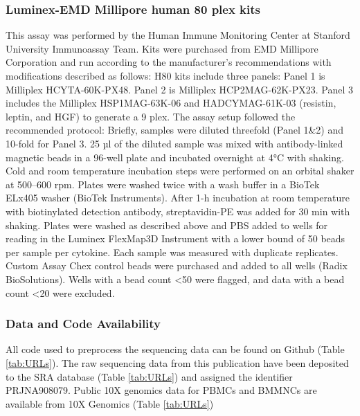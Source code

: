 \subsubsection{Luminex-EMD Millipore human 80 plex kits}

This assay was performed by the Human Immune Monitoring Center at Stanford University Immunoassay Team. Kits were purchased from EMD Millipore Corporation and run according to the manufacturer’s recommendations with modifications described as follows: H80 kits include three panels: Panel 1 is Milliplex HCYTA-60K-PX48. Panel 2 is Milliplex HCP2MAG-62K-PX23. Panel 3 includes the Milliplex HSP1MAG-63K-06 and HADCYMAG-61K-03 (resistin, leptin, and HGF) to generate a 9 plex. The assay setup followed the recommended protocol: Briefly, samples were diluted threefold (Panel 1\&2) and 10-fold for Panel 3. 25 µl of the diluted sample was mixed with antibody-linked magnetic beads in a 96-well plate and incubated overnight at 4°C with shaking. Cold and room temperature incubation steps were performed on an orbital shaker at 500–600 rpm. Plates were washed twice with a wash buffer in a BioTek ELx405 washer (BioTek Instruments). After 1-h incubation at room temperature with biotinylated detection antibody, streptavidin-PE was added for 30 min with shaking. Plates were washed as described above and PBS added to wells for reading in the Luminex FlexMap3D Instrument with a lower bound of 50 beads per sample per cytokine. Each sample was measured with duplicate replicates. Custom Assay Chex control beads were purchased and added to all wells (Radix BioSolutions). Wells with a bead count <50 were flagged, and data with a bead count <20 were excluded.


\subsubsection{Data and Code Availability}

All code used to preprocess the sequencing data can be found on Github (Table \ref{tab:URLs}). The raw sequencing data from this publication have been deposited to the SRA database (Table \ref{tab:URLs}) and assigned the identifier PRJNA908079. Public 10X genomics data for PBMCs and BMMNCs are available from 10X Genomics (Table \ref{tab:URLs})



